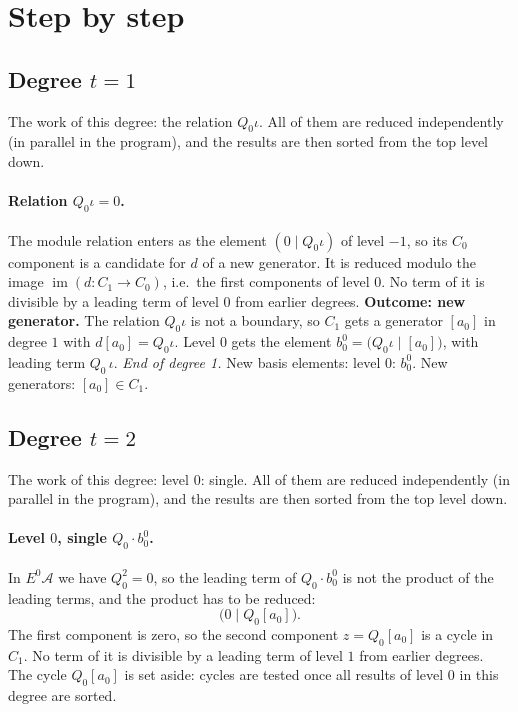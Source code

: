 \documentclass[11pt]{article}
\newcommand{\A}{\mathcal{A}}
\begin{document}
\section{Step by step}

\subsection*{Degree $t = 1$}
\noindent The work of this degree: the relation $Q_0\iota$. All of them are reduced independently (in parallel in the program), and the results are then sorted from the top level down.
\medskip
\paragraph{Relation $Q_0\iota = 0$.} The module relation enters as the element $(0 \mid Q_0\iota)$ of level $-1$, so its $C_0$ component is a candidate for $d$ of a new generator. It is reduced modulo the image $\operatorname{im}(d\colon C_1\to C_0)$, i.e.\ the first components of level $0$.
No term of it is divisible by a leading term of level $0$ from earlier degrees.
\textbf{Outcome: new generator.} The relation $Q_{0}\iota$ is not a boundary, so $C_{1}$ gets a generator $[a_0]$ in degree $1$ with $d[a_0] = Q_{0}\iota$.
Level $0$ gets the element $b^{0}_{0} = \bigl(Q_{0}\iota \;\big|\; [a_0]\bigr)$, with leading term $Q_{0}\,\iota$.
\medskip\noindent\emph{End of degree 1.} New basis elements: level $0$: $b^{0}_{0}$. New generators: $[a_0]\in C_{1}$.
\subsection*{Degree $t = 2$}
\noindent The work of this degree: level $0$: single. All of them are reduced independently (in parallel in the program), and the results are then sorted from the top level down.
\medskip
\paragraph{Level $0$, single $Q_{0}\cdot b^{0}_{0}$.} In $E^0\A$ we have $Q_{0}^2 = 0$, so the leading term of $Q_{0}\cdot b^{0}_{0}$ is not the product of the leading terms, and the product has to be reduced:
\[\bigl(0 \;\big|\; Q_{0}[a_0]\bigr).\]
The first component is zero, so the second component $z = Q_{0}[a_0]$ is a cycle in $C_{1}$.
No term of it is divisible by a leading term of level $1$ from earlier degrees.
The cycle $Q_{0}[a_0]$ is set aside: cycles are tested once all results of level $0$ in this degree are sorted.
\medskip
\end{document}
